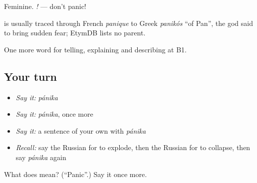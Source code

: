 Feminine. \emph{ !} — don't panic!

\begin{cousinweb}
\emph{} is usually traced through French \emph{panique} to Greek \emph{panikós} \textquotedblleft{}of Pan\textquotedblright{}, the god said to bring sudden fear; EtymDB lists no parent.
\end{cousinweb}

\begin{grammarlens}[title={What you've built}]
One more word for telling, explaining and describing at B1.
\end{grammarlens}

\subsection*{Your turn}
\begin{itemize}
\raggedright
  \item \emph{Say it:} \emph{pánika}
  \item \emph{Say it:} \emph{pánika}, once more
  \item \emph{Say it:} a sentence of your own with \emph{pánika}
  \item \emph{Recall:} say the Russian for to explode, then the Russian for to collapse, then say \emph{pánika} again
\end{itemize}

\begin{tcolorbox}[breakable,colback=teal!4,colframe=teal!35!black,title={Before you move on}]
What does  mean? (\textquotedblleft{}Panic\textquotedblright{}.) Say it once more.
\end{tcolorbox}
